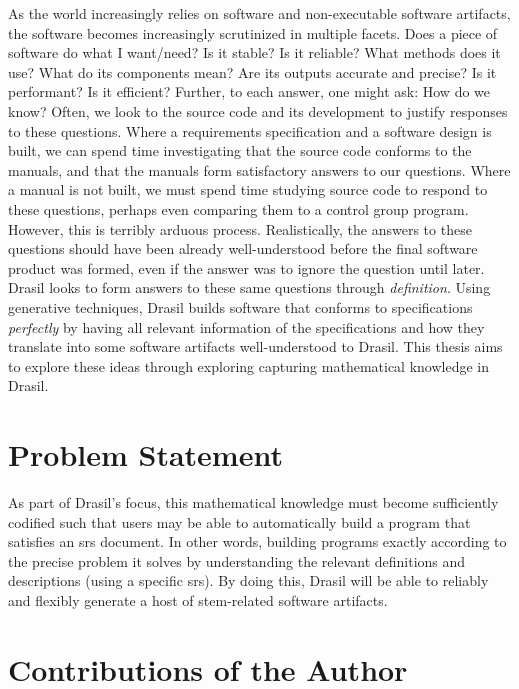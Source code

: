 As the world increasingly relies on software and non-executable software
artifacts, the software becomes increasingly scrutinized in multiple facets.
Does a piece of software do what I want/need? Is it stable? Is it reliable? What
methods does it use? What do its components mean? Are its outputs accurate and
precise? Is it performant? Is it efficient? Further, to each answer, one might
ask: How do we know? Often, we look to the source code and its development to
justify responses to these questions. Where a requirements specification and a
software design is built, we can spend time investigating that the source code
conforms to the manuals, and that the manuals form satisfactory answers to our
questions. Where a manual is not built, we must spend time studying source code
to respond to these questions, perhaps even comparing them to a control group
program. However, this is terribly arduous process. Realistically, the answers
to these questions should have been already well-understood before the final
software product was formed, even if the answer was to ignore the question until
later. Drasil \cite{Drasil2021} looks to form answers to these same questions
through \textit{definition}. Using generative techniques, Drasil builds software
that conforms to specifications \textit{perfectly} by having all relevant
information of the specifications and how they translate into some software
artifacts well-understood to Drasil. This thesis aims to explore these ideas
through exploring capturing mathematical knowledge in Drasil.

\section{Problem Statement}
\label{sec:intro:problemStatement}

As part of Drasil's focus, this mathematical knowledge must become sufficiently
codified such that users may be able to automatically build a program that
satisfies an \acs{srs} document. In other words, building programs exactly
according to the precise problem it solves by understanding the relevant
definitions and descriptions (using a specific \acs{srs}). By doing this, Drasil
will be able to reliably and flexibly generate a host of \acs{stem}-related
software artifacts.

\section{Contributions of the Author}
\label{sec:intro:contributions}

